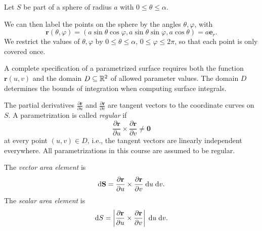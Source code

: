 \documentclass[a4paper]{article}
\begin{document}
\begin{eg}
  Let $S$ be part of a sphere of radius $a$ with $0 \leq \theta \leq \alpha$.
  \begin{center}
  \end{center}
  We can then label the points on the sphere by the angles $\theta, \varphi$, with
  \[
    \mathbf{r}(\theta, \varphi) = (a\sin \theta\cos\varphi, a\sin \theta\sin \varphi, a\cos \theta) = a\mathbf{e}_r.
  \]
  We restrict the values of $\theta, \varphi$ by $0 \leq \theta \leq \alpha$, $0 \leq \varphi \leq 2\pi$, so that each point is only covered once.
\end{eg}

\begin{rmk}
  A complete specification of a parametrized surface requires both the function $\mathbf{r}(u, v)$ and the domain $D \subseteq \mathbb{R}^2$ of allowed parameter values. The domain $D$ determines the bounds of integration when computing surface integrals.
\end{rmk}

\begin{defi}
  The partial derivatives $\frac{\partial \mathbf{r}}{\partial u}$ and $\frac{\partial \mathbf{r}}{\partial v}$ are tangent vectors to the coordinate curves on $S$. A parametrization is called \emph{regular} if
  \[
    \frac{\partial \mathbf{r}}{\partial u} \times \frac{\partial \mathbf{r}}{\partial v} \neq \mathbf{0}
  \]
  at every point $(u, v) \in D$, i.e., the tangent vectors are linearly independent everywhere. All parametrizations in this course are assumed to be regular.
\end{defi}

\begin{prop}
  The \emph{vector area element} is
  \[
    \mathrm{d} \mathbf{S} = \frac{\partial \mathbf{r}}{\partial u}\times \frac{\partial \mathbf{r}}{\partial v}\;\mathrm{d} u\;\mathrm{d} v.
  \]
  The \emph{scalar area element} is
  \[
    \mathrm{d} S = \left|\frac{\partial \mathbf{r}}{\partial u}\times \frac{\partial \mathbf{r}}{\partial v}\right|\;\mathrm{d} u\;\mathrm{d} v.
  \]
\end{prop}
\end{document}
